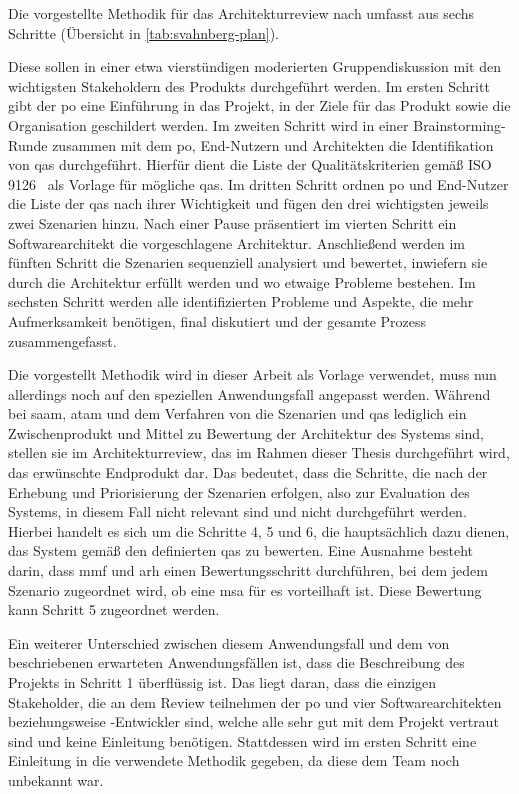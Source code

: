 Die vorgestellte Methodik für das Architekturreview nach   umfasst aus sechs Schritte (Übersicht in \cref{tab:svahnberg-plan}).

Diese sollen in einer etwa vierstündigen moderierten Gruppendiskussion mit den wichtigsten Stakeholdern des Produkts durchgeführt werden.
Im ersten Schritt gibt der \gls{po} eine Einführung in das Projekt, in der Ziele für das Produkt sowie die Organisation geschildert werden.
Im zweiten Schritt wird in einer Brainstorming-Runde zusammen mit dem \gls{po}, End-Nutzern und Architekten die Identifikation von \glspl{qa} durchgeführt.
Hierfür dient die Liste der Qualitätskriterien gemäß ISO 9126~\cite{ISO-9126} als Vorlage für mögliche \glspl{qa}.
Im dritten Schritt ordnen \gls{po} und End-Nutzer die Liste der \glspl{qa} nach ihrer Wichtigkeit und fügen den drei wichtigsten jeweils zwei Szenarien hinzu.
Nach einer Pause präsentiert im vierten Schritt ein Softwarearchitekt die vorgeschlagene Architektur.
Anschließend werden im fünften Schritt die Szenarien sequenziell analysiert und bewertet, inwiefern sie durch die Architektur erfüllt werden und wo etwaige Probleme bestehen.
Im sechsten Schritt werden alle identifizierten Probleme und Aspekte, die mehr Aufmerksamkeit benötigen, final diskutiert und der gesamte Prozess zusammengefasst.

Die vorgestellt Methodik wird in dieser Arbeit als Vorlage verwendet, muss nun allerdings noch auf den speziellen Anwendungsfall angepasst werden.
Während bei \gls{saam}, \gls{atam} und dem Verfahren von  die Szenarien und \glspl{qa} lediglich ein Zwischenprodukt und Mittel zu Bewertung der Architektur des Systems sind, stellen sie im Architekturreview, das im Rahmen dieser Thesis durchgeführt wird, das erwünschte Endprodukt dar.
Das bedeutet, dass die Schritte, die nach der Erhebung und Priorisierung der Szenarien erfolgen, also zur Evaluation des Systems, in diesem Fall nicht relevant sind und nicht durchgeführt werden.
Hierbei handelt es sich um die Schritte 4, 5 und 6, die hauptsächlich dazu dienen, das System gemäß den definierten \glspl{qa} zu bewerten.
Eine Ausnahme besteht darin, dass \gls{mmf} und \gls{arh} einen Bewertungsschritt durchführen, bei dem jedem Szenario zugeordnet wird, ob eine \gls{msa} für es vorteilhaft ist.
Diese Bewertung kann Schritt 5 zugeordnet werden.

Ein weiterer Unterschied zwischen diesem Anwendungsfall und dem von  beschriebenen erwarteten Anwendungsfällen ist, dass die Beschreibung des Projekts in Schritt 1 überflüssig ist.
Das liegt daran, dass die einzigen Stakeholder, die an dem Review teilnehmen der \acrfull{po} und vier Softwarearchitekten beziehungsweise -Entwickler sind, welche alle sehr gut mit dem Projekt vertraut sind und keine Einleitung benötigen.
Stattdessen wird im ersten Schritt eine Einleitung in die verwendete Methodik gegeben, da diese dem Team noch unbekannt war.

